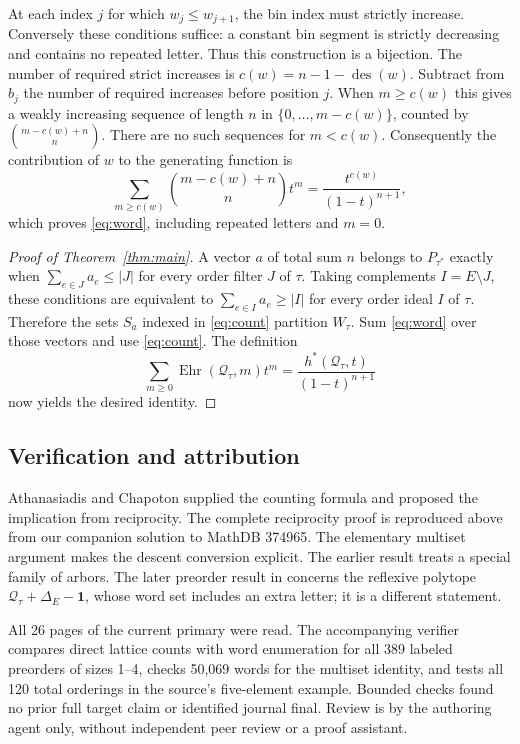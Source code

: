 \documentclass[11pt]{article}
\newcommand{\Q}{\mathcal Q}
\newcommand{\des}{\operatorname{des}}
\begin{document}
At each index $j$ for which $w_j\le w_{j+1}$, the bin index must
strictly increase. Conversely these conditions suffice: a constant
bin segment is strictly decreasing and contains no repeated letter.
Thus this construction is a bijection. The number of required
strict increases is $c(w)=n-1-\des(w)$. Subtract from $b_j$ the
number of required increases before position $j$. When $m\ge c(w)$
this gives a weakly increasing sequence of length $n$ in
$\{0,\ldots,m-c(w)\}$, counted by
$\binom{m-c(w)+n}{n}$. There are no such sequences for $m<c(w)$.
Consequently the contribution of $w$ to the generating function is
\[
 \sum_{m\ge c(w)}\binom{m-c(w)+n}{n}t^m
 =\frac{t^{c(w)}}{(1-t)^{n+1}},
\]
which proves \eqref{eq:word}, including repeated letters and $m=0$.

\begin{proof}[Proof of Theorem~\ref{thm:main}]
A vector $a$ of total sum $n$ belongs to $P_{\tau^*}$ exactly
when $\sum_{e\in J}a_e\le |J|$ for every order filter $J$ of
$\tau$. Taking complements $I=E\setminus J$, these conditions
are equivalent to $\sum_{e\in I}a_e\ge |I|$ for every order
ideal $I$ of $\tau$. Therefore the sets $S_a$ indexed in
\eqref{eq:count} partition $W_\tau$.
Sum \eqref{eq:word} over those vectors and use \eqref{eq:count}.
The definition
\[
 \sum_{m\ge0}\operatorname{Ehr}(\Q_\tau,m)t^m
 =\frac{h^*(\Q_\tau,t)}{(1-t)^{n+1}}
\]
now yields the desired identity.
\end{proof}

\subsection*{Verification and attribution}
Athanasiadis and Chapoton supplied the counting formula and
proposed the implication from reciprocity. The complete
reciprocity proof is reproduced above from our companion solution
to MathDB 374965. The elementary multiset argument makes the
descent conversion explicit. The earlier result \cite{AXY} treats
a special family of arbors. The later preorder result in
\cite[Corollary 5.4]{Y} concerns the reflexive polytope
$\Q_\tau+\Delta_E-\mathbf1$, whose word set includes an extra
letter; it is a different statement.

All 26 pages of the current primary were read. The accompanying
verifier compares direct lattice counts with word enumeration for
all 389 labeled preorders of sizes 1--4, checks 50,069 words for
the multiset identity, and tests all 120 total orderings in the
source's five-element example. Bounded checks found no prior full
target claim or identified journal final. Review is by the
authoring agent only, without independent peer review or a proof assistant.
\end{document}

